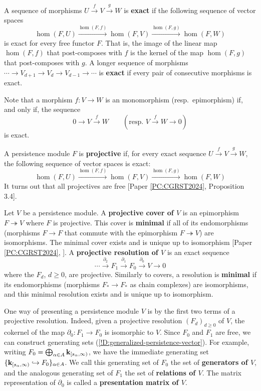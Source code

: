 \begin{definition}
\label{!D:exact}
  A sequence of morphisms $U \xrightarrow{f} V \xrightarrow{g} W$ is \textbf{exact} if the following sequence of vector spaces
  \[
    \hom(F, U) \xrightarrow{\hom(F, f)} \hom(F, V) \xrightarrow{\hom(F, g)} \hom(F, W)
  \]
  is exact for every free functor $F$. That is, the image of the linear map $\hom(F, f)$ that post-composes with $f$ is the kernel of the map $\hom(F, g)$ that post-com\-poses with $g$. A longer sequence of morphisms $\cdots \to V_{d + 1} \to V_d \to V_{d - 1} \to \cdots$ is \textbf{exact} if every pair of consecutive morphisms is exact.
  
  Note that a morphism $f \colon V \to W$ is an monomorphism (resp.\ epimorphism) if, and only if, the sequence
  \[
    0 \to V \xrightarrow{f} W \qquad (\text{resp.\ } V \xrightarrow{f} W \to 0)
  \]
  is exact.
  
  A persistence module $F$ is \textbf{projective} if, for every exact sequence $U \xrightarrow{f} V \xrightarrow{g} W$, the following sequence of vector spaces is exact:
  \[
    \hom(F, U) \xrightarrow{\hom(F, f)} \hom(F, V) \xrightarrow{\hom(F, g)} \hom(F, W)
  \]
  It turns out that all projectives are free [Paper \ref{PC:CGRST2024}, Proposition 3.4].
  
  Let $V$ be a persistence module. A \textbf{projective cover of $V$} is an epimorphism $F \twoheadrightarrow V$ where $F$ is projective. This cover is \textbf{minimal} if all of its endomorphisms (morphisms $F \to F$ that commute with the epimorphism $F \twoheadrightarrow V$) are isomorphisms. The minimal cover exists and is unique up to isomorphism [Paper \ref{PC:CGRST2024}, ]. A \textbf{projective resolution of $V$} is an exact sequence
  \[
    \cdots \xrightarrow{\partial_2} F_1 \xrightarrow{\partial_1} F_0 \xrightarrow{\partial_0} V \to 0
  \]
  where the $F_d$, $d \geq 0$, are projective. Similarly to covers, a resolution is \textbf{minimal} if its endomorphisms (morphisms $F_* \to F_*$ as chain complexes) are isomorphisms, and this minimal resolution exists and is unique up to isomorphism.
\end{definition}

\begin{remark}
\label{R:generators-and-relations}
  One way of presenting a persistence module $V$ is by the first two terms of a projective resolution. Indeed, given a projective resolution $(F_d)_{d \geq 0}$ of $V$, the cokernel of the map $\partial_0 \colon F_1 \to F_0$ is isomorphic to $V$. Since $F_0$ and $F_1$ are free, we can construct generating sets (\cref{!D:generalized-persistence-vector}). For example, writing $F_0 = \bigoplus_{\alpha \in A} \mathbf{k}_{[s_\alpha, \infty)}$, we have the immediate generating set $\{\mathbf{k}_{[s_\alpha, \infty)} \hookrightarrow F_0\}_{\alpha \in A}$. We call this generating set of $F_0$ the set of \textbf{generators of $V$}, and the analogous generating set of $F_1$ the set of \textbf{relations of $V$}. The matrix representation of $\partial_0$ is called a \textbf{presentation matrix of $V$}.
\end{remark}

